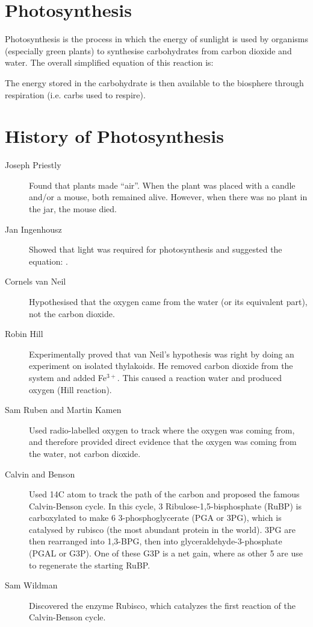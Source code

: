 \section{Photosynthesis}

Photosynthesis is the process in which the energy of sunlight is used by organisms (especially green plants) to synthesise carbohydrates from carbon dioxide and water.
The overall simplified equation of this reaction is:

The energy stored in the carbohydrate is then available to the biosphere through respiration (i.e. carbs used to respire).

\section{History of Photosynthesis}
\begin{description}
\item[Joseph Priestly] Found that plants made ``air''.
When the plant was placed with a candle and/or a mouse, both remained alive.
However, when there was no plant in the jar, the mouse died.
\item[Jan Ingenhousz] Showed that light was required for photosynthesis and suggested the equation: .
\item[Cornels van Neil] Hypothesised that the oxygen came from the water (or its equivalent part), not the carbon dioxide.
\item[Robin Hill] Experimentally proved that van Neil's hypothesis was right by doing an experiment on isolated thylakoids.
He removed carbon dioxide from the system and added Fe$^{3+}$.
This caused a reaction water and produced oxygen (Hill reaction).
\item[Sam Ruben and Martin Kamen] Used radio-labelled oxygen to track where the oxygen was coming from, and therefore provided direct evidence that the oxygen was coming from the water, not carbon dioxide.
\item[Calvin and Benson] Used 14C atom to track the path of the carbon and proposed the famous Calvin-Benson cycle.
In this cycle, 3 Ribulose-1,5-bisphosphate (RuBP) is carboxylated to make 6 3-phosphoglycerate (PGA or 3PG), which is catalysed by rubisco (the most abundant protein in the world).
3PG are then rearranged into 1,3-BPG, then into glyceraldehyde-3-phosphate (PGAL or G3P).
One of these G3P is a net gain, where as other 5 are use to regenerate the starting RuBP.

\begin{center}
\end{center}

\item[Sam Wildman] Discovered the enzyme Rubisco, which catalyzes the first reaction of the Calvin-Benson cycle.
\end{description}

